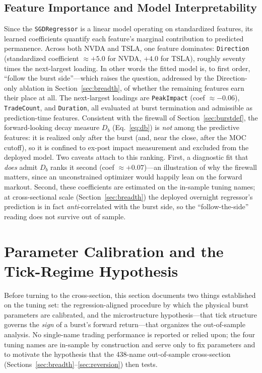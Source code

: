 \documentclass[11pt]{article}
\begin{document}
\subsection{Feature Importance and Model Interpretability}
Since the \texttt{SGDRegressor} is a linear model operating on standardized features, its learned coefficients quantify each feature's marginal contribution to predicted permanence. Across both NVDA and TSLA, one feature dominates: \texttt{Direction} (standardized coefficient $\approx +5.0$ for NVDA, $+4.0$ for TSLA), roughly seventy times the next-largest loading. In other words the fitted model is, to first order, ``follow the burst side''---which raises the question, addressed by the Direction-only ablation in Section~\ref{sec:breadth}, of whether the remaining features earn their place at all. The next-largest loadings are \texttt{PeakImpact} (coef $\approx -0.06$), \texttt{TradeCount}, and \texttt{Duration}, all evaluated at burst termination and admissible as prediction-time features. Consistent with the firewall of Section~\ref{sec:burstdef}, the forward-looking decay measure $D_b$ (Eq.~\ref{eq:db}) is \emph{not} among the predictive features: it is realized only after the burst (and, near the close, after the MOC cutoff), so it is confined to ex-post impact measurement and excluded from the deployed model. Two caveats attach to this ranking. First, a diagnostic fit that \emph{does} admit $D_b$ ranks it second (coef $\approx +0.07$)---an illustration of why the firewall matters, since an unconstrained optimizer would happily lean on the forward markout. Second, these coefficients are estimated on the in-sample tuning names; at cross-sectional scale (Section~\ref{sec:breadth}) the deployed overnight regressor's prediction is in fact \emph{anti}-correlated with the burst side, so the ``follow-the-side'' reading does not survive out of sample.

\section{Parameter Calibration and the Tick-Regime Hypothesis}
\label{sec:empirical}
Before turning to the cross-section, this section documents two things established on the tuning set: the regression-aligned procedure by which the physical burst parameters are calibrated, and the microstructure hypothesis---that tick structure governs the \emph{sign} of a burst's forward return---that organizes the out-of-sample analysis. No single-name trading performance is reported or relied upon; the four tuning names are in-sample by construction and serve only to fix parameters and to motivate the hypothesis that the 438-name out-of-sample cross-section (Sections~\ref{sec:breadth}--\ref{sec:reversion}) then tests.
\end{document}
